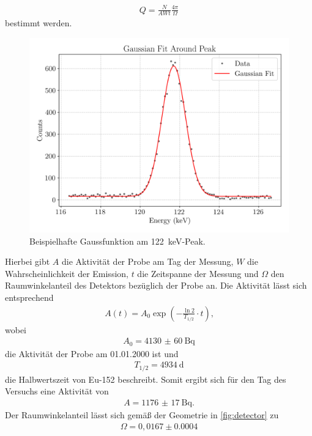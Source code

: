 \begin{align}
  Q=\frac{N}{AWt}\frac{4\pi}{\Omega}\label{eqn:Q}
\end{align}
bestimmt werden.
\begin{figure}[H]
  \centering
  \includegraphics[scale=0.65]{Skripte/fep.png}
  \caption{Beispielhafte Gaussfunktion am \SI{122}{\kilo\eV}-Peak.}
  \label{fig:Eu4}
\end{figure}
Hierbei gibt $A$ die Aktivität der Probe am Tag der Messung, $W$ die Wahrscheinlichkeit der Emission, $t$ die Zeitspanne der Messung und $\Omega$ den Raumwinkelanteil des Detektors bezüglich der Probe an.
Die Aktivität lässt sich entsprechend
\begin{align}
  A(t)=A_0\exp{\left(-\frac{\ln{2}}{T_{1/2}} \cdot t\right)}\text{,}
\end{align}
wobei
\begin{align*}
  A_0 = \SI{4130(60)}{\becquerel}
\end{align*}
die Aktivität der Probe am 01.01.2000 ist\cite{anleitung} und 
\begin{align*}
  T_{1/2}=\SI{4934}{\day}
\end{align*}
die Halbwertszeit von Eu-152 beschreibt\cite{Kondev2021}.
Somit ergibt sich für den Tag des Versuchs eine Aktivität von
\begin{align*}
  A=\SI{1176(17)}{\becquerel}\text{.}
\end{align*}
Der Raumwinkelanteil lässt sich gemäß der Geometrie in \autoref{fig:detector} zu
\begin{align*}
  \Omega=0,0167\pm0.0004
\end{align*}
